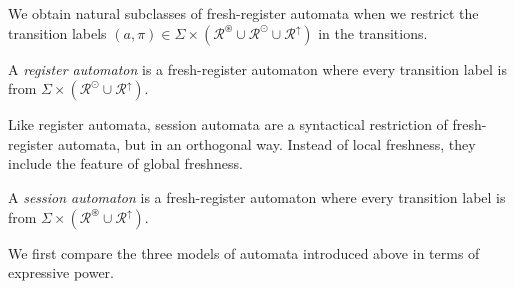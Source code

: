 \documentclass{LMCS}
\newcommand{\Reg}{\mathcal{R}}
\newcommand{\rReg}{\Reg^\uparrow}
\newcommand{\lReg}{\Reg^\odot}
\newcommand{\gReg}{\Reg^\circledast}
\newcommand{\extReg}{\gReg \mathrel{\cup} \lReg \mathrel{\cup} \rReg}
\newcommand{\param}{\pi}
\begin{document}
We obtain natural subclasses of fresh-register automata when we
restrict the transition labels $(a,\param) \in \Sigma \times
(\extReg)$ in the transitions.

\begin{defi}
  A \emph{register automaton} is a fresh-register automaton where
  every transition label is from $\Sigma \times (\lReg \cup \rReg)$.
\end{defi}

Like register automata, session automata are a syntactical restriction
of fresh-register automata, but in an orthogonal way. Instead of local
freshness, they include the feature of global freshness.

\begin{defi}
  A \emph{session automaton} is a fresh-register automaton where every
  transition label is from $\Sigma \times (\gReg \cup \rReg)$.
\end{defi}

We first compare the three models of automata introduced above in
terms of expressive power.
\end{document}
